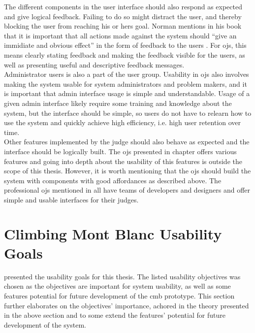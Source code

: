 The different components in the user interface should also respond as expected and give logical feedback. Failing to do so might distract the user, and thereby blocking the user from reaching his or hers goal. Norman mentions in his book that it is important that all actions made against the system should ``give an immidiate and obvious effect'' in the form of feedback to the users \cite{norman1988design}. For \glspl{oj}, this means clearly stating feedback and making the feedback visible for the users, as well as presenting useful and descriptive feedback messages.\\

Administrator users is also a part of the user group. Usability in \glspl{oj} also involves making the system usable for system administrators and problem makers, and it is important that admin interface usage is simple and understandable. Usage of a given admin interface likely require some training and knowledge about the system, but the interface should be simple, so users do not have to relearn how to use the system and quickly achieve high efficiency, i.e. high user retention over time. \\

Other features implemented by the judge should also behave as expected and the interface should be logically built. The \glspl{oj} presented in chapter offers various features and going into depth about the usability of this features is outside the scope of this thesis. However, it is worth mentioning that the \glspl{oj} should build the system with components with good affordances as described above. The professional \glspl{oj} mentioned in  all have teams of developers and designers and offer simple and usable interfaces for their judges.

\section{Climbing Mont Blanc Usability Goals}
\label{sec:cmb-usability}
 presented the usability goals for this thesis. The listed usability objectives was chosen as the objectives are important for system usability, as well as some features potential for future development of the \gls{cmb} prototype. This section further elaborates on the objectives' importance, achored in the theory presented in the above section and to some extend the features' potential for future development of the system. \\

